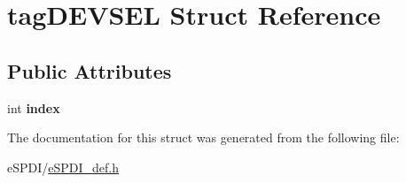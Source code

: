 \hypertarget{structtag_d_e_v_s_e_l}{}\section{tag\+D\+E\+V\+S\+EL Struct Reference}
\label{structtag_d_e_v_s_e_l}
\subsection*{Public Attributes}
\begin{DoxyCompactItemize}
\item 
\mbox{\label{structtag_d_e_v_s_e_l_a00cea6d96c1b00c843c03d924b7afdd5}} 
int {\bfseries index}
\end{DoxyCompactItemize}


The documentation for this struct was generated from the following file\+:\begin{DoxyCompactItemize}
\item 
e\+S\+P\+D\+I/\hyperlink{e_s_p_d_i__def_8h}{e\+S\+P\+D\+I\+\_\+def.\+h}\end{DoxyCompactItemize}
